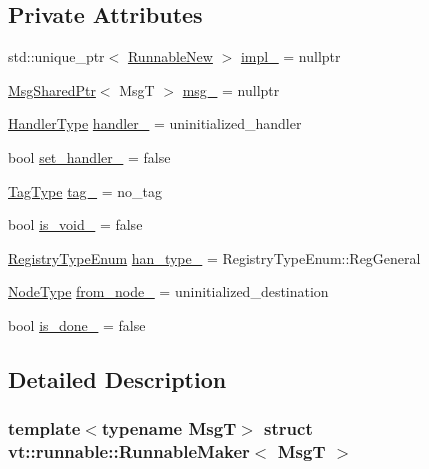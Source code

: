 \subsection*{Private Attributes}
\begin{DoxyCompactItemize}
\item 
std\+::unique\+\_\+ptr$<$ \hyperlink{structvt_1_1runnable_1_1_runnable_new}{Runnable\+New} $>$ \hyperlink{structvt_1_1runnable_1_1_runnable_maker_ae7075cf590020886a7e7319a13d4b4c5}{impl\+\_\+} = nullptr
\item 
\hyperlink{namespacevt_ab2b3d506ec8e8d1540aede826d84a239}{Msg\+Shared\+Ptr}$<$ MsgT $>$ \hyperlink{structvt_1_1runnable_1_1_runnable_maker_aa8d73c577b47287104b9d87e4228ed37}{msg\+\_\+} = nullptr
\item 
\hyperlink{namespacevt_af64846b57dfcaf104da3ef6967917573}{Handler\+Type} \hyperlink{structvt_1_1runnable_1_1_runnable_maker_a627ad83f0608f9b91c5ecedecf2f8d75}{handler\+\_\+} = uninitialized\+\_\+handler
\item 
bool \hyperlink{structvt_1_1runnable_1_1_runnable_maker_a52fd27acc3c3259743fdd7aed09d690d}{set\+\_\+handler\+\_\+} = false
\item 
\hyperlink{namespacevt_a84ab281dae04a52a4b243d6bf62d0e52}{Tag\+Type} \hyperlink{structvt_1_1runnable_1_1_runnable_maker_a5d76922354a61ff8d94eb734960fb64b}{tag\+\_\+} = no\+\_\+tag
\item 
bool \hyperlink{structvt_1_1runnable_1_1_runnable_maker_a5a50a669e9bf0a147fdeb2a482554304}{is\+\_\+void\+\_\+} = false
\item 
\hyperlink{namespacevt_1_1auto__registry_a9f369ca2b484130b396729e2ddf05241}{Registry\+Type\+Enum} \hyperlink{structvt_1_1runnable_1_1_runnable_maker_afb8a21bfcf5a2a36a3d18dec16d422c8}{han\+\_\+type\+\_\+} = Registry\+Type\+Enum\+::\+Reg\+General
\item 
\hyperlink{namespacevt_a866da9d0efc19c0a1ce79e9e492f47e2}{Node\+Type} \hyperlink{structvt_1_1runnable_1_1_runnable_maker_ad053690f0793a709289f3c1d240a2851}{from\+\_\+node\+\_\+} = uninitialized\+\_\+destination
\item 
bool \hyperlink{structvt_1_1runnable_1_1_runnable_maker_a1a09d169753ee4c91ba1b42c291038f0}{is\+\_\+done\+\_\+} = false
\end{DoxyCompactItemize}


\subsection{Detailed Description}
\subsubsection*{template$<$typename MsgT$>$\newline
struct vt\+::runnable\+::\+Runnable\+Maker$<$ Msg\+T $>$}


